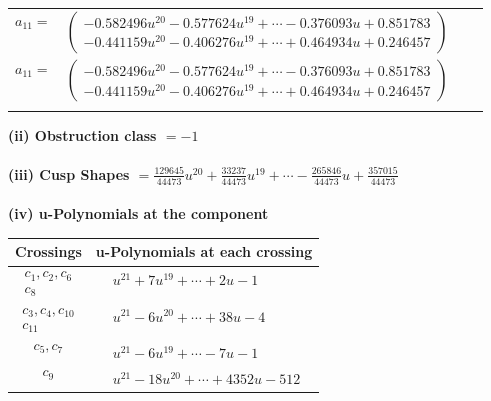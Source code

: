 \documentclass[1p]{elsarticle_modified}
\theoremstyle{definition}
\begin{document}
\begin{tabular}{m{7pt} m{180pt} m{7pt} m{180pt} }
\flushright $a_{11}=$&$\begin{pmatrix}-0.582496 u^{20}-0.577624 u^{19}+\cdots-0.376093 u+0.851783\\-0.441159 u^{20}-0.406276 u^{19}+\cdots+0.464934 u+0.246457\end{pmatrix}$\\ \flushright $a_{11}=$&$\begin{pmatrix}-0.582496 u^{20}-0.577624 u^{19}+\cdots-0.376093 u+0.851783\\-0.441159 u^{20}-0.406276 u^{19}+\cdots+0.464934 u+0.246457\end{pmatrix}$\\&\end{tabular}
\flushleft \textbf{(ii) Obstruction class $= -1$}\\~\\
\flushleft \textbf{(iii) Cusp Shapes $= \frac{129645}{44473} u^{20}+\frac{33237}{44473} u^{19}+\cdots-\frac{265846}{44473} u+\frac{357015}{44473}$}\\~\\
\newpage\renewcommand{\arraystretch}{1}
\flushleft \textbf{(iv) u-Polynomials at the component}\newline \\
\begin{tabular}{m{50pt}|m{274pt}}
Crossings & \hspace{64pt}u-Polynomials at each crossing \\
\hline $$\begin{aligned}c_{1},c_{2},c_{6}\\c_{8}\end{aligned}$$&$\begin{aligned}
&u^{21}+7 u^{19}+\cdots+2 u-1
\end{aligned}$\\
\hline $$\begin{aligned}c_{3},c_{4},c_{10}\\c_{11}\end{aligned}$$&$\begin{aligned}
&u^{21}-6 u^{20}+\cdots+38 u-4
\end{aligned}$\\
\hline $$\begin{aligned}c_{5},c_{7}\end{aligned}$$&$\begin{aligned}
&u^{21}-6 u^{19}+\cdots-7 u-1
\end{aligned}$\\
\hline $$\begin{aligned}c_{9}\end{aligned}$$&$\begin{aligned}
&u^{21}-18 u^{20}+\cdots+4352 u-512
\end{aligned}$\\
\hline
\end{tabular}\\~\\
\end{document}
